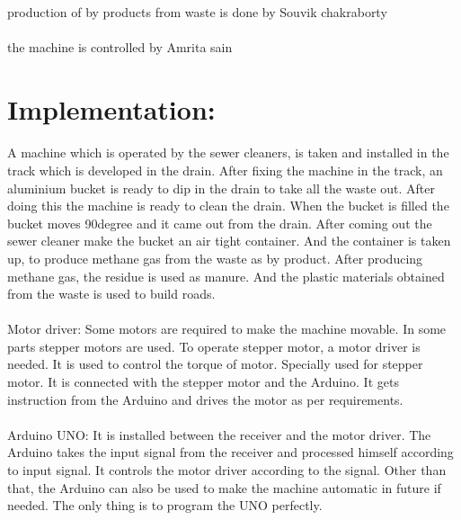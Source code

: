 \documentclass[]{article}
\begin{document}
\paragraph{}
production of by products from waste is done by Souvik chakraborty
\paragraph{}
the machine is controlled by Amrita sain
 
\section{Implementation:}
\paragraph{}
A machine which is operated by the sewer cleaners, is taken and installed in the track which is developed in the drain. After fixing the machine in the track, an aluminium bucket is ready to dip in the drain to take all the waste out. After doing this the machine is ready to clean the drain. When the bucket is filled the bucket moves 90degree and it came out from the drain. After coming out the sewer cleaner make the bucket an air tight container. And the container is taken up, to produce methane gas from the waste as by product. After producing methane gas, the residue is used as manure. And the plastic materials obtained from the waste is used to build roads.

\paragraph{}
Motor driver:	Some motors are required to make the machine movable. In some parts stepper motors are used. To operate stepper motor, a motor driver is needed. It is used to control the torque of motor. Specially used for stepper motor. It is connected with the stepper motor and the Arduino. It gets instruction from the Arduino and drives the motor as per requirements. 

\paragraph{}
Arduino UNO: It is installed between the receiver and the motor driver. The Arduino takes the input signal from the receiver and processed himself according to input signal. It controls the motor driver according to the signal. 	Other than that, the Arduino can also be used to make the machine automatic in future if needed. The only thing is to program the UNO perfectly.
\end{document}

